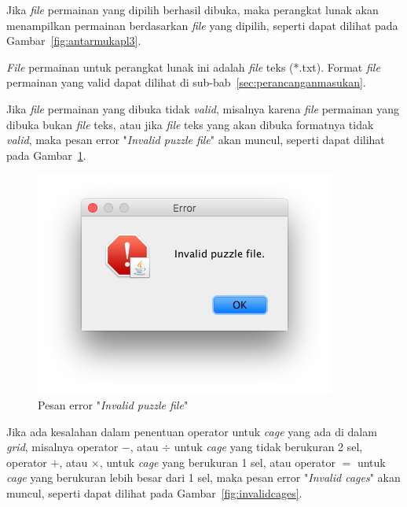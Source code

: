 \begin{enumerate}
Jika \textit{file} permainan yang dipilih berhasil dibuka, maka perangkat lunak akan menampilkan permainan berdasarkan \textit{file} yang dipilih, seperti dapat dilihat pada Gambar~\ref{fig:antarmukapl3}.

\textit{File} permainan untuk perangkat lunak ini adalah \textit{file} teks (*.txt). Format \textit{file} permainan yang valid dapat dilihat di sub-bab~\ref{sec:perancanganmasukan}.

Jika \textit{file} permainan yang dibuka tidak \textit{valid}, misalnya karena \textit{file} permainan yang dibuka bukan \textit{file} teks, atau jika \textit{file} teks yang akan dibuka formatnya tidak \textit{valid}, maka pesan error "\textit{Invalid puzzle file}" akan muncul, seperti dapat dilihat pada Gambar~\ref{fig:invalidpuzzlefile}.

\begin{figure}
\centering
\captionsetup{justification=centering}
\includegraphics[scale=0.5]{Gambar/ImplementasiPengujian/InvalidPuzzleFile.png}
\caption[Pesan error "\textit{Invalid puzzle file}"]{Pesan error "\textit{Invalid puzzle file}"}
\label{fig:invalidpuzzlefile}
\end{figure}

Jika ada kesalahan dalam penentuan operator untuk \textit{cage} yang ada di dalam \textit{grid}, misalnya operator \begin{math}-\end{math}, atau \begin{math}\div\end{math} untuk \textit{cage} yang tidak berukuran 2 sel, operator \begin{math}+\end{math}, atau \begin{math}\times\end{math}, untuk \textit{cage} yang berukuran 1 sel, atau operator \begin{math}=\end{math} untuk \textit{cage} yang berukuran lebih besar dari 1 sel, maka pesan error "\textit{Invalid cages}" akan muncul, seperti dapat dilihat pada Gambar~\ref{fig:invalidcages}.


\end{enumerate}
